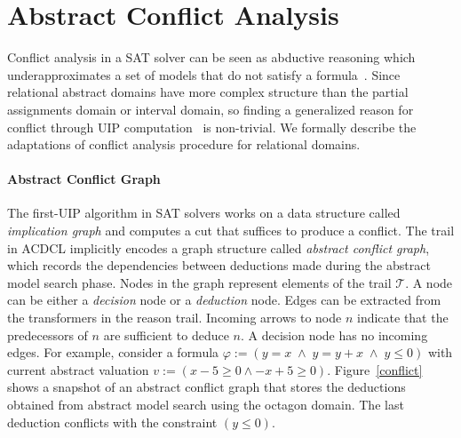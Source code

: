 \section{Abstract Conflict Analysis}
Conflict analysis in a SAT solver can be seen as abductive 
reasoning which underapproximates a set of models that do not satisfy a 
formula~\cite{sas12,dhk2013-popl}.  
Since relational abstract domains have more complex structure than the partial 
assignments domain or interval domain, so finding a generalized reason for 
conflict through UIP computation~\cite{uip} is non-trivial.  We formally 
describe the adaptations of conflict analysis procedure for relational domains.  

\paragraph {\textbf{Abstract Conflict Graph}}
The first-UIP algorithm in SAT solvers works on a data structure called 
{\em implication graph} and computes a cut that suffices to produce a 
conflict.  The trail in ACDCL implicitly encodes a graph structure called 
{\em abstract conflict graph}, which records the dependencies between 
deductions made during the abstract model search phase.  Nodes in the graph 
represent elements of the trail $\mathcal{T}$.  A node can be either a
{\em decision} node or a {\em deduction} node. Edges can be extracted from
the transformers in the reason trail.  Incoming arrows to node $n$ 
indicate that the predecessors of $n$ are sufficient to deduce $n$.  
A decision node has no incoming edges.  
For example, consider a formula 
$\varphi:= (y=x \; \wedge \; y=y+x \; \wedge \; y \leq 0)$ with current 
abstract valuation $v:= (x-5 \geq 0 \wedge -x+5 \geq 0)$.  
Figure~\ref{conflict} shows a snapshot of an abstract conflict graph that 
stores the deductions obtained from abstract model search using the octagon domain.  
The last deduction conflicts with the constraint $(y \leq 0)$.  

